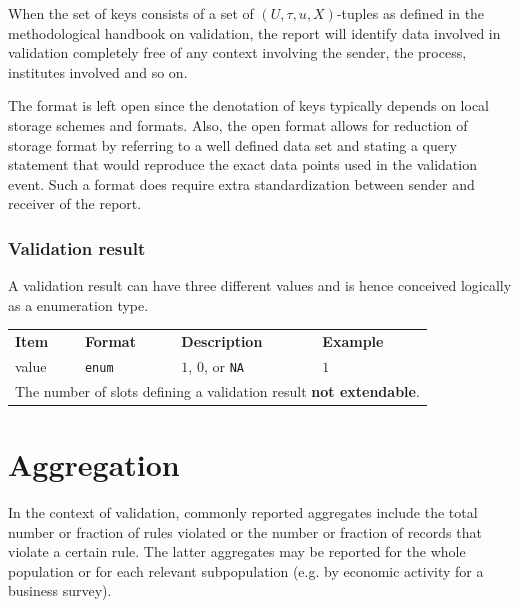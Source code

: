 \documentclass[a4paper, 11pt,titlepage]{article}
\newcommand{\code}[1]{\texttt{#1}}
\newcommand{\na}{{\normalfont \texttt{NA}}}
\begin{document}
When the set of keys consists of a set of $(U,\tau,u,X)$-tuples as defined in
the methodological handbook on validation, the report will identify data
involved in validation completely free of any context involving the sender, the
process, institutes involved and so on. 

The format is left open since the denotation of keys typically depends on
local storage schemes and formats. Also, the open format allows for reduction
of storage format by referring to a well defined data set and stating a query
statement that would reproduce the exact data points used in the validation
event. Such a format does require extra standardization between sender and
receiver of the report.


\subsubsection{Validation result}
\label{sect:valres}
A validation result can have three different values and is hence conceived
logically as a enumeration type.
\begin{center}
\begin{tabular}{|lp{15mm}p{}p{}|}
\hline
\textbf{Item} & \textbf{Format} & \textbf{Description} &\textbf{Example}\\
value  & \code{enum} & $1$, $0$, or \na{}    &$1$\\
\hline
\multicolumn{4}{|l|}{The number of slots defining a validation result \textbf{not extendable}.
}\\
\hline
\end{tabular}
\end{center}







\section{Aggregation}
In the context of validation, commonly reported aggregates include the total
number or fraction of rules violated or the number or fraction of records  that
violate a certain rule. The latter aggregates may be reported for the whole
population or for each relevant subpopulation (e.g. by economic activity for a
business survey). 
\end{document}
